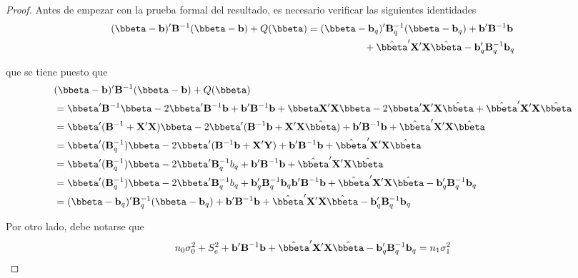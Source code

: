 \begin{proof}
Antes de empezar con la prueba formal del resultado, es necesario verificar las siguientes identidades
\begin{align}\label{5.2.9}
(\bbeta-\mathbf{b})'\mathbf{B}^{-1}(\bbeta-\mathbf{b})+Q(\bbeta)&=
(\bbeta-\mathbf{b}_q)'\mathbf{B}^{-1}_q(\bbeta-\mathbf{b}_q)+\mathbf{b}'\mathbf{B}^{-1}\mathbf{b}
\notag \\
&\hspace{2cm}
+\hat{\bbeta}'\mathbf{X}'\mathbf{X}\hat{\bbeta}
-\mathbf{b}'_q\mathbf{B}_q^{-1}\mathbf{b}_q
\end{align}

que se tiene puesto que
\begin{align*}
&(\bbeta-\mathbf{b})'\mathbf{B}^{-1}(\bbeta-\mathbf{b})+Q(\bbeta)\\
&=\bbeta'\mathbf{B}^{-1}\bbeta-2\bbeta'\mathbf{B}^{-1}\mathbf{b}+\mathbf{b}'\mathbf{B}^{-1}\mathbf{b}+\bbeta \mathbf{X}'\mathbf{X}\bbeta
-2\bbeta'\mathbf{X}'\mathbf{X} \hat{\bbeta}+\hat{\bbeta}'\mathbf{X}'\mathbf{X} \hat{\bbeta}\\
&=\bbeta'(\mathbf{B}^{-1}+\mathbf{X}'\mathbf{X})\bbeta-2\bbeta'(\mathbf{B}^{-1}\mathbf{b}+\mathbf{X}'\mathbf{X}\hat{\bbeta})+
\mathbf{b}'\mathbf{B}^{-1}\mathbf{b}+\hat{\bbeta}'\mathbf{X}'\mathbf{X} \hat{\bbeta}\\
&=\bbeta'(\mathbf{B}^{-1}_q)\bbeta-2\bbeta'(\mathbf{B}^{-1}\mathbf{b}+\mathbf{X}'\mathbf{Y})+
\mathbf{b}'\mathbf{B}^{-1}\mathbf{b}+\hat{\bbeta}'\mathbf{X}'\mathbf{X} \hat{\bbeta}\\
&=\bbeta'(\mathbf{B}^{-1}_q)\bbeta-2\bbeta'\mathbf{B}^{-1}_qb_q+
\mathbf{b}'\mathbf{B}^{-1}\mathbf{b}+\hat{\bbeta}'\mathbf{X}'\mathbf{X} \hat{\bbeta}\\
&=\bbeta'(\mathbf{B}^{-1}_q)\bbeta-2\bbeta'\mathbf{B}^{-1}_qb_q+\mathbf{b}_q'\mathbf{B}_q^{-1}\mathbf{b}_q
\mathbf{b}'\mathbf{B}^{-1}\mathbf{b}+\hat{\bbeta}'\mathbf{X}'\mathbf{X} \hat{\bbeta}-\mathbf{b}_q'\mathbf{B}_q^{-1}\mathbf{b}_q\\
&=(\bbeta-\mathbf{b}_q)'\mathbf{B}^{-1}_q(\bbeta-\mathbf{b}_q)+\mathbf{b}'\mathbf{B}^{-1}\mathbf{b}
+\hat{\bbeta}'\mathbf{X}'\mathbf{X}\hat{\bbeta}
-\mathbf{b}'_q\mathbf{B}_q^{-1}\mathbf{b}_q
\end{align*}

Por otro lado, debe notarse que
\begin{align}\label{5.2.10}
n_0\sigma_0^2+S^2_e+\mathbf{b}'\mathbf{B}^{-1}\mathbf{b}+\hat{\bbeta}'\mathbf{X}'\mathbf{X}\hat{\bbeta}
-\mathbf{b}'_q\mathbf{B}_q^{-1}\mathbf{b}_q=n_1\sigma_1^2
\end{align}


\end{proof}
